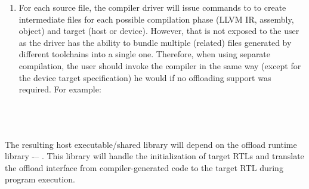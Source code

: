 \begin{enumerate}
  \item For each source file, the compiler driver will issue commands to to create intermediate files for each possible compilation phase (LLVM IR, assembly, object) and target (host or device). However, that is not exposed to the user as the driver has the ability to bundle multiple (related) files generated by different toolchains into a single one. Therefore, when using separate compilation, the user should invoke the compiler in the same way (except for the device target specification) he would if no offloading support was required. For example:
  \\ ~ \\
  \\ ~ \\
\end{enumerate}

The resulting host executable/shared library will depend on the offload runtime library -– \libomptarget{}. This library will handle the initialization of target RTLs and translate the offload interface from compiler-generated code to the target RTL during program execution.
